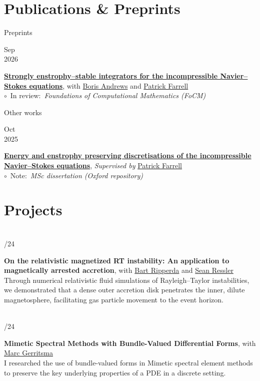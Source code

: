 \documentclass[a4paper,10pt]{article}
\renewcommand{\small}{\fontsize{12.5}{12.5}\selectfont}
\newcommand{\person}[2]{\textcolor{linkcol}{\href{#1}{#2}}}
\newcommand{\subsectitle}[1]{{\color{brick}\fontsize{15}{17}\selectfont #1}\par\vspace{2pt}}
\newlength{\datewidth}
\newlength{\pubwidth}
\newcommand{\pubentry}[3]{%
  \vspace{2pt}%
  \begin{minipage}[t]{\datewidth}
    \raggedleft #1\\#2
  \end{minipage}%
  \hspace{0.4cm}%
  \begin{minipage}[t]{\pubwidth}
    #3
  \end{minipage}%
  \vspace{2pt}%
}
\newcommand{\pubtitle}[1]{\textbf{\textcolor{pubcol}{#1}}}
\newcommand{\pubnote}[2]{{\small \textcolor{brick}{$\circ$}\ #1\ \textit{#2}}}
\newcommand{\projtitle}[1]{\textbf{#1}}
\newcommand{\projentry}[4]{%
  \vspace{2pt}%
  \begin{minipage}[t]{\datewidth}
    \raggedleft #1
  \end{minipage}%
  \hspace{0.4cm}%
  \begin{minipage}[t]{\pubwidth}
    \projtitle{#2}, with #3\\[2pt]
    {\small #4}%
  \end{minipage}%
  \vspace{2pt}%
}
\begin{document}
\section*{Publications \& Preprints}

\subsectitle{Preprints}

\pubentry{Sep}{2026}{%
  \pubtitle{\href{https://arxiv.org/abs/2609.15520}{Strongly enstrophy--stable integrators for the incompressible Navier--Stokes equations}}, with \person{https://borisandrews.github.io/}{Boris Andrews} and \person{https://pefarrell.org/}{Patrick Farrell}\\[2pt]
  \pubnote{In review:}{Foundations of Computational Mathematics (FoCM)}%
}

\vspace{2pt}
\subsectitle{Other works}

\pubentry{Oct}{2025}{%
  \pubtitle{\href{https://matinshams.me/assets/dissertation.pdf}{Energy and enstrophy preserving discretisations of the incompressible Navier--Stokes equations}}, \textit{Supervised by} \person{https://pefarrell.org/}{Patrick Farrell}\\[2pt]
  \pubnote{Note:}{MSc dissertation (Oxford repository)}%
}

\section*{Projects}

\projentry{2023\\/24}%
{On the relativistic magnetized RT instability: An application to magnetically arrested accretion}%
{\person{https://bartripperda.com/}{Bart Ripperda} and \person{https://smressle.bitbucket.io/index.html}{Sean Ressler}}%
{Through numerical relativistic fluid simulations of Rayleigh--Taylor instabilities, we demonstrated that a dense outer accretion disk penetrates the inner, dilute magnetosphere, facilitating gas particle movement to the event horizon.}

\vspace{5pt}
\projentry{2023\\/24}%
{Mimetic Spectral Methods with Bundle-Valued Differential Forms}%
{\person{https://www.tudelft.nl/en/staff/m.i.gerritsma/}{Marc Gerritsma}}%
{I researched the use of bundle-valued forms in Mimetic spectral element methods to preserve the key underlying properties of a PDE in a discrete setting.}
\end{document}
